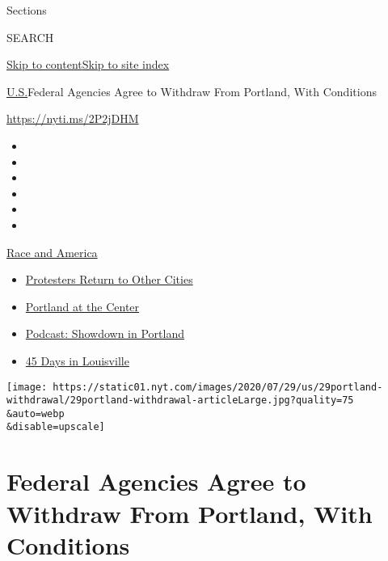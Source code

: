 Sections

SEARCH

\protect\hyperlink{site-content}{Skip to
content}\protect\hyperlink{site-index}{Skip to site index}

\href{/section/us}{U.S.}\textbar{}Federal Agencies Agree to Withdraw
From Portland, With Conditions

\url{https://nyti.ms/2P2jDHM}

\begin{itemize}
\item
\item
\item
\item
\item
\item
\end{itemize}

\href{https://www.nytimes.com/news-event/george-floyd-protests-minneapolis-new-york-los-angeles?action=click\&pgtype=Article\&state=default\&region=TOP_BANNER\&context=storylines_menu}{Race
and America}

\begin{itemize}
\tightlist
\item
  \href{https://www.nytimes.com/2020/07/26/us/protests-portland-seattle-trump.html?action=click\&pgtype=Article\&state=default\&region=TOP_BANNER\&context=storylines_menu}{Protesters
  Return to Other Cities}
\item
  \href{https://www.nytimes.com/2020/07/24/us/portland-oregon-protests-white-race.html?action=click\&pgtype=Article\&state=default\&region=TOP_BANNER\&context=storylines_menu}{Portland
  at the Center}
\item
  \href{https://www.nytimes.com/2020/07/23/podcasts/the-daily/portland-protests.html?action=click\&pgtype=Article\&state=default\&region=TOP_BANNER\&context=storylines_menu}{Podcast:
  Showdown in Portland}
\item
  \href{https://www.nytimes.com/interactive/2020/07/16/us/black-lives-matter-protests-louisville-breonna-taylor.html?action=click\&pgtype=Article\&state=default\&region=TOP_BANNER\&context=storylines_menu}{45
  Days in Louisville}
\end{itemize}

\texttt{[image: https://static01.nyt.com/images/2020/07/29/us/29portland-withdrawal/29portland-withdrawal-articleLarge.jpg?quality=75\\\&auto=webp\\\&disable=upscale]}

\hypertarget{federal-agencies-agree-to-withdraw-from-portland-with-conditions}{%
\section{Federal Agencies Agree to Withdraw From Portland, With
Conditions}\label{federal-agencies-agree-to-withdraw-from-portland-with-conditions}}

